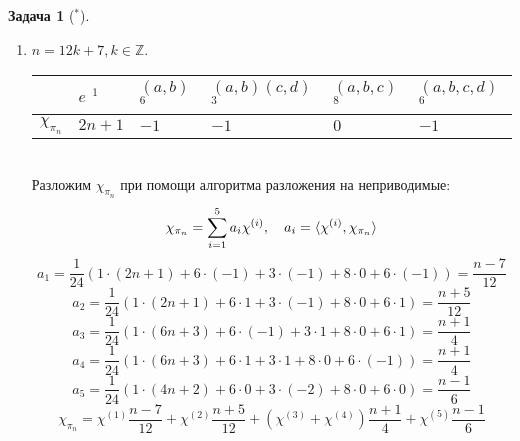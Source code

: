 \documentclass[12pt]{article}
\theoremstyle{definition}
\newtheorem{zad}{Задача}[section]
\begin{document}
\begin{zad}[$^*$]
\begin{itemize}
\begin{enumerate}
    \item $n=12k+7,k\in\mathbb{Z}$.
    \begin{table}[h!]
    \centering
    \begin{tabular}{|l|l|l|l|l|l|}
    \hline
     & $e$ $^1$ & $(a,b)$ $^6$ & $(a,b)(c,d)$ $^3$ & $(a,b,c)$ $^8$ & $(a,b,c,d)$ $^6$ \\ \hline
    $\chi_{\pi_n}$ & $2n+1$ & $-1$ & $-1$ & $0$ & $-1$ \\ \hline
    \end{tabular}
    \end{table}\\
    Разложим $\chi_{\pi_n}$ при помощи алгоритма разложения на неприводимые:
    \begin{equation}
        \chi_{\pi_n}=\sum\limits_{i=1}^5 a_i\chi^{(i)},\quad a_i=\braket{\chi^{(i)},\chi_{\pi_n}}
    \end{equation}
    \begin{equation}
        a_1=\frac{1}{24}(1\cdot(2n+1)+6\cdot(-1)+3\cdot(-1)+8\cdot0+6\cdot(-1))=\frac{n-7}{12}
    \end{equation}
    \begin{equation}
        a_2=\frac{1}{24}(1\cdot(2n+1)+6\cdot1+3\cdot(-1)+8\cdot0+6\cdot1)=\frac{n+5}{12}
    \end{equation}
    \begin{equation}
        a_3=\frac{1}{24}(1\cdot(6n+3)+6\cdot(-1)+3\cdot1+8\cdot0+6\cdot1)=\frac{n+1}{4}
    \end{equation}
    \begin{equation}
        a_4=\frac{1}{24}(1\cdot(6n+3)+6\cdot1+3\cdot1+8\cdot0+6\cdot(-1))=\frac{n+1}{4}
    \end{equation}
    \begin{equation}
        a_5=\frac{1}{24}(1\cdot(4n+2)+6\cdot0+3\cdot(-2)+8\cdot0+6\cdot0)=\frac{n-1}{6}
    \end{equation}
    \begin{equation}
        \boxed{\chi_{\pi_n}=\chi^{(1)}\frac{n-7}{12}+\chi^{(2)}\frac{n+5}{12}+(\chi^{(3)}+\chi^{(4)})\frac{n+1}{4}+\chi^{(5)}\frac{n-1}{6}}
    \end{equation}
    

\end{enumerate}
\end{itemize}
\end{zad}
\end{document}
